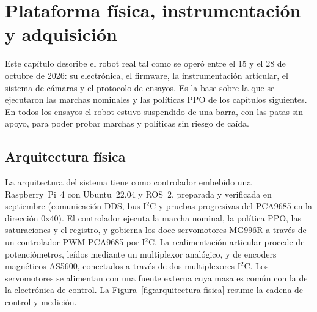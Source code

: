 \chapter{Plataforma física, instrumentación y adquisición}
\label{cap:plataforma-fisica}

Este capítulo describe el robot real tal como se operó entre el 15 y el 28 de
octubre de 2026: su electrónica, el firmware, la instrumentación articular, el
sistema de cámaras y el protocolo de ensayos. Es la base sobre la que se
ejecutaron las marchas nominales y las políticas PPO de los capítulos
siguientes. En todos los ensayos el robot estuvo suspendido de una barra, con
las patas sin apoyo, para poder probar marchas y políticas sin riesgo de caída.

\section{Arquitectura física}

La arquitectura del sistema tiene como controlador embebido una Raspberry~Pi~4
con Ubuntu~22.04 y ROS~2, preparada y verificada en septiembre (comunicación DDS,
bus I$^2$C y pruebas progresivas del PCA9685 en la dirección 0x40). El
controlador ejecuta la marcha nominal, la política PPO, las saturaciones y el
registro, y gobierna los doce servomotores MG996R a través de un controlador PWM
PCA9685 por I$^2$C. La realimentación articular procede de potenciómetros, leídos
mediante un multiplexor analógico, y de encoders magnéticos AS5600, conectados a
través de dos multiplexores I$^2$C. Los servomotores se alimentan con una fuente
externa cuya masa es común con la de la electrónica de control. La
Figura~\ref{fig:arquitectura-fisica} resume la cadena de control y medición.

